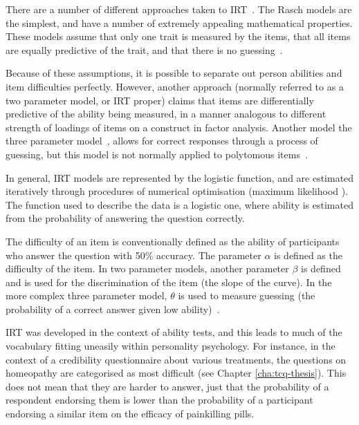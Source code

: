 There are a number of different approaches taken to IRT~\cite{van1997handbook,fischer1995rasch}. The  Rasch models are the simplest, and have a number of extremely appealing mathematical properties. These models assume that only one trait is measured by the items, that all items are equally predictive of the trait, and that there is no guessing~\cite{van1997handbook}.

Because of these assumptions, it is possible to separate out person abilities and item difficulties perfectly. However, another approach (normally referred to as a two parameter model, or IRT proper) claims that items are differentially predictive of the ability being measured, in a manner analogous to different strength of loadings of items on a construct in factor analysis. Another model the three parameter model~\cite{lord1968statistical}, allows for correct responses through a process of guessing, but this model is not normally applied to polytomous items~\cite{van1997handbook,Mair2010}.


In general, IRT models are represented by the logistic function, and are estimated iteratively through procedures of numerical optimisation (maximum likelihood \cite{fischer1995rasch}). The function used to describe the data is a logistic one, where ability is estimated from the probability of answering the question correctly. %

The difficulty of an item is conventionally defined as the ability of participants who answer the question with 50\% accuracy. The parameter $\alpha$ is defined as the difficulty of the item. In two parameter models, another parameter $\beta$ is defined and is used for the discrimination of the item (the slope of the curve). In the more complex three parameter model, $\theta$ is used to measure guessing (the probability of a correct answer given low ability)~\cite{van1997handbook}.

IRT was developed in the context of ability tests, and this leads to much of the vocabulary fitting uneasily within personality psychology. For instance, in the context of a credibility questionnaire about various treatments, the questions on homeopathy are categorised as most difficult (see Chapter \ref{cha:tcq-thesis}). This does not mean that they are harder to answer, just that the probability of a respondent endorsing them is lower than the probability of a participant endorsing a similar item on the efficacy of painkilling pills.

